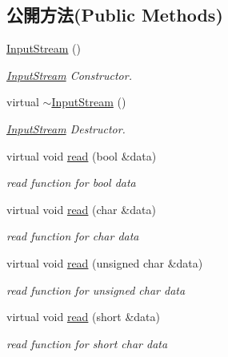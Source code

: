 \subsection*{公開方法(Public Methods)}
\begin{DoxyCompactItemize}
\item 
\hyperlink{class_i_dream_sky_1_1_input_stream_ae3e586d2e72f53b3f7cc1b84001b3631}{Input\+Stream} ()
\begin{DoxyCompactList}\small\item\em \hyperlink{class_i_dream_sky_1_1_input_stream}{Input\+Stream} Constructor. \end{DoxyCompactList}\item 
virtual \hyperlink{class_i_dream_sky_1_1_input_stream_ae71831adce618d60783c287a2ac7075a}{$\sim$\+Input\+Stream} ()
\begin{DoxyCompactList}\small\item\em \hyperlink{class_i_dream_sky_1_1_input_stream}{Input\+Stream} Destructor. \end{DoxyCompactList}\item 
virtual void \hyperlink{class_i_dream_sky_1_1_input_stream_abf81563a45454f198366e06a8cf4b27b}{read} (bool \&data)
\begin{DoxyCompactList}\small\item\em read function for bool data \end{DoxyCompactList}\item 
virtual void \hyperlink{class_i_dream_sky_1_1_input_stream_a174a51441a2630a8afeb08fac726f3ab}{read} (char \&data)
\begin{DoxyCompactList}\small\item\em read function for char data \end{DoxyCompactList}\item 
virtual void \hyperlink{class_i_dream_sky_1_1_input_stream_a1ff54d938219e4588ba5a7e4c1238de1}{read} (unsigned char \&data)
\begin{DoxyCompactList}\small\item\em read function for unsigned char data \end{DoxyCompactList}\item 
virtual void \hyperlink{class_i_dream_sky_1_1_input_stream_ac2b967dc82ccc626db741ae16974e615}{read} (short \&data)
\begin{DoxyCompactList}\small\item\em read function for short char data \end{DoxyCompactList}\item 

\end{DoxyCompactItemize}
